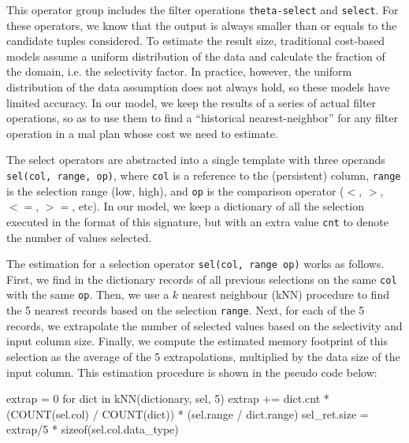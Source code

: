\documentclass[conference]{IEEEtran}
\begin{document}
%	
%	
%
%
This operator group includes the filter operations \texttt{\small theta-select} and \texttt{\small select}.
For these operators, we know that the output is always smaller than or equals to the candidate tuples considered.
To estimate the result size, traditional cost-based models assume a uniform distribution of the data and calculate the fraction of the domain, i.e. the selectivity factor.
In practice, however, the uniform distribution of the data assumption does not always hold, so these models have limited accuracy.
In our model, we keep the results of a series of actual filter operations, so as to use them to find a ``historical nearest-neighbor'' for any filter operation in a {\sc mal} plan whose cost we need to estimate.

The select operators are abstracted into a single template with three operands \texttt{\small sel(col, range, op)}, where \texttt{\small col} is a reference to the (persistent) column, \texttt{\small range} is the selection range (low, high), and \texttt{\small op} is the comparison operator ($<$, $>$, $<=$, $>=$, etc).
In our model, we keep a dictionary of all the selection executed in the format of this signature, 
but with an extra value \texttt{\small cnt} to denote the number of values selected.

The estimation for a selection operator \texttt{\small sel(col, range op)} works as follows.
First, we find in the dictionary records of all previous selections on the same \texttt{\small col} with the same \texttt{\small op}.
Then, we use a $k$ nearest neighbour (kNN) procedure to find the 5 nearest records based on the selection \texttt{\small range}.
Next, for each of the 5 records, we extrapolate the number of selected values based on the selectivity and input column size. 
Finally, we compute the estimated memory footprint of this selection as the average of the 5 extrapolations, multiplied by the data size of the input column.
This estimation procedure is shown in the pseudo code below:
\begin{verb}
extrap = 0
for dict in kNN(dictionary, sel, 5)
  extrap += dict.cnt * (COUNT(sel.col) / COUNT(dict)) * 
            (sel.range / dict.range)
sel_ret.size = extrap/5 * sizeof(sel.col.data_type)
\end{verb}
\end{document}
